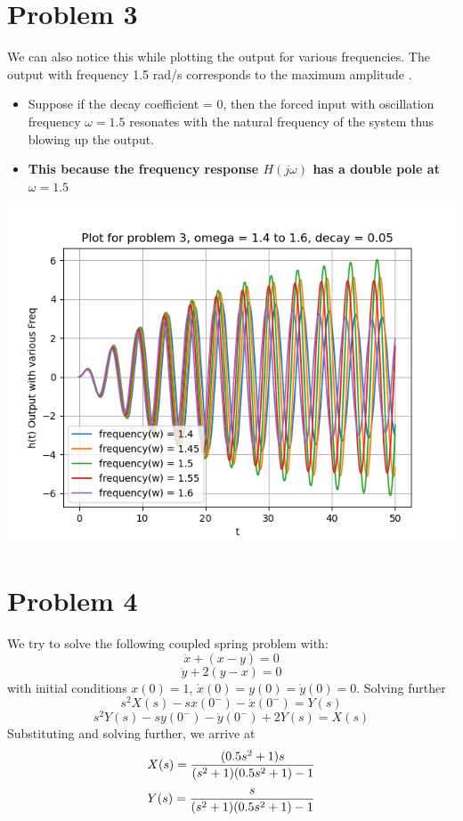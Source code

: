 \documentclass[12pt, a4paper]{report}
\begin{document}
\section*{Problem 3}
We can also notice this while plotting the output for various frequencies. The output with frequency 1.5 rad/s corresponds to the maximum amplitude .
\begin{itemize}
     \item Suppose if the decay coefficient = 0, then the forced input with oscillation frequency $\omega = 1.5$ resonates with the natural frequency of the system thus blowing up the output. 
     \item \textbf{This because the frequency response $H(j\omega)$ has a double pole at $\omega = 1.5$}
\end{itemize}
\begin{center}
	\includegraphics[scale=0.8]{Figure_3.png} 
	\label{fig:rawdata}
\end{center}


\section*{Problem 4}
We try to solve the following coupled spring problem with:
\begin{equation*}
\ddot{x} + (x-y) = 0
\end{equation*}
\begin{equation*}
\ddot{y} + 2(y-x) = 0
\end{equation*}
with initial conditions $x(0) = 1$, $\dot{x}(0) = y(0) = \dot{y}(0) = 0$. Solving further 
\begin{equation*}
s^2X(s) -sx(0^-) - \dot{x}(0^-) = Y(s)
\end{equation*}
\begin{equation*}
s^2Y(s) -sy(0^-) - \dot{y}(0^-) + 2Y(s)= X(s)
\end{equation*}
Substituting and solving further, we arrive at
\begin{equation*}
X(s) = \frac{(0.5s^2+1)s}{(s^2 + 1)(0.5s^2 + 1) - 1}\\
\end{equation*}
\begin{equation*}
Y(s) = \frac{s}{(s^2 + 1)(0.5s^2 + 1) - 1}\\
\end{equation*}
\end{document}

